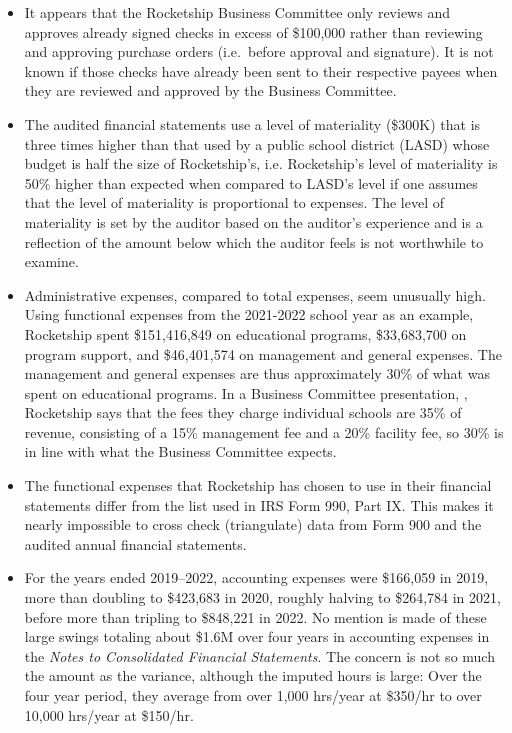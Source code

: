 \begin{itemize}
  \item It appears that the Rocketship Business Committee only reviews and approves already signed checks in excess of \$100,000 rather than reviewing and approving purchase orders (i.e.~before approval and signature). It is not known if those checks have already been sent to their respective payees when they are reviewed and approved by the Business Committee.

  \item The audited financial statements use a level of materiality (\$300K) that is three times higher than that used by a public school district (LASD) whose budget is half the size of Rocketship's, i.e. Rocketship's level of materiality is 50\% higher than expected when compared to LASD's level if one assumes that the level of materiality is proportional to expenses. The level of materiality is set by the auditor based on the auditor's experience and is a reflection of the amount below which the auditor feels is not worthwhile to examine.

  \item Administrative expenses, compared to total expenses, seem unusually high. Using functional expenses from the 2021-2022 school year as an example, Rocketship spent \$151,416,849 on educational programs, \$33,683,700 on program support, and \$46,401,574 on management and general expenses.  The management and general expenses are thus approximately 30\% of what was spent on educational programs. In a Business Committee presentation, \textcite[28]{Mukhopadhyay2013}, Rocketship says that the fees they charge individual schools are 35\% of revenue, consisting of a 15\% management fee and a 20\% facility fee, so 30\% is in line with what the Business Committee expects.

  \item The functional expenses that Rocketship has chosen to use in their financial statements differ from the list used in IRS Form 990, Part IX\@. This makes it nearly impossible to cross check (triangulate) data from Form 900 and the audited annual financial statements.

  \item  For the years ended 2019–2022, accounting expenses were \$166,059 in 2019, more than doubling to \$423,683 in 2020, roughly halving to \$264,784 in 2021, before more than tripling to \$848,221 in 2022. No mention is made of these large swings totaling about \$1.6M over four years in accounting expenses in the \textit{Notes to Consolidated Financial Statements}. The concern is not so much the amount as the variance, although the imputed hours is large: Over the four year period, they average from over 1,000 hrs/year at \$350/hr to over 10,000 hrs/year at \$150/hr.


\end{itemize}
